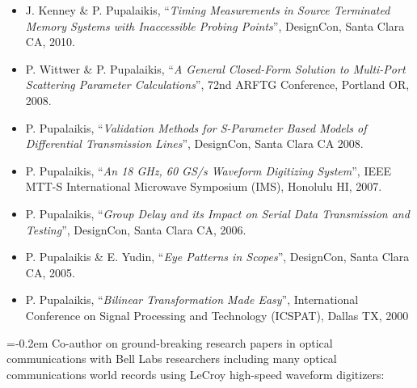 \documentclass[10pt,letterpaper]{extarticle}
\newenvironment{indentsection}[1]%
{\begin{list}{}%
	{\setlength{\leftmargin}{#1}}%
	\item[]%
}
{\end{list}}
\begin{document}
\begin{indentsection}{-1em}
\begin{itemize}
\item J. Kenney \& P. Pupalaikis, “\emph{Timing Measurements in Source Terminated Memory Systems with Inaccessible Probing Points}”, DesignCon, Santa Clara CA, 2010. 
\item P. Wittwer \& P. Pupalaikis, “\emph{A General Closed-Form Solution to Multi-Port Scattering Parameter Calculations}”, 72nd ARFTG Conference, Portland OR, 2008.
\item P. Pupalaikis, “\emph{Validation Methods for S-Parameter Based Models of Differential Transmission Lines}”, DesignCon, Santa Clara CA 2008. 
\item P. Pupalaikis, “\emph{An 18 GHz, 60 GS/s Waveform Digitizing System}”, IEEE MTT-S International Microwave Symposium (IMS), Honolulu HI, 2007. 
\item P. Pupalaikis, “\emph{Group Delay and its Impact on Serial Data Transmission and Testing}”, DesignCon, Santa Clara CA, 2006. 
\item P. Pupalaikis \& E. Yudin, “\emph{Eye Patterns in Scopes}”, DesignCon, Santa Clara CA, 2005. 
\item P. Pupalaikis, “\emph{Bilinear Transformation Made Easy}”, International Conference on Signal Processing and Technology (ICSPAT), Dallas TX, 2000 
\end{itemize}\end{indentsection}
\begin{flushleft} 
\parskip=-0.2em
Co-author on ground-breaking research papers in optical communications with Bell Labs researchers including many optical communications world records using LeCroy high-speed waveform digitizers:
\end{flushleft}
\end{document}

